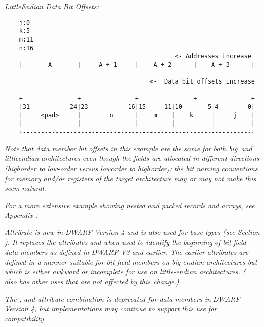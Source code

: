 \textit{Little\dash  Endian Data Bit Offsets:}
\begin{verbatim}
    j:0
    k:5
    m:11
    n:16
                                               <- Addresses increase
    |       A       |     A + 1     |    A + 2      |    A + 3      | 

                                        <-  Data bit offsets increase 

    +---------------+---------------+---------------+---------------+
    |31           24|23           16|15     11|10       5|4        0|
    |     <pad>     |        n      |    m    |    k     |     j    |
    |               |               |         |          |          |
    +---------------------------------------------------------------+

\end{verbatim}

\textit{Note that data member bit offsets in this example are the
same for both big\dash\ and little\dash endian architectures even
though the fields are allocated in different directions
(high\dash order to low-order versus low\dash order to high\dash order);
the bit naming conventions for memory and/or registers of
the target architecture may or may not make this seem natural.}

\textit{For a more extensive example showing nested and packed records
and arrays, see 
Appendix .}

\textit{Attribute  is new in DWARF Version 4 and
is also used for base types 
(see Section ). 
It replaces the
attributes  and  when used to
identify the beginning of bit field data members as defined
in DWARF V3 and earlier. The earlier attributes are defined
in a manner suitable for bit field members on big-endian
architectures but which is either awkward or incomplete for
use on little-endian architectures.  ( also
has other uses that are not affected by this change.)}

\textit{The ,  and 
attribute combination is deprecated for data members in DWARF
Version 4, but implementations may continue to support this
use for compatibility.}

